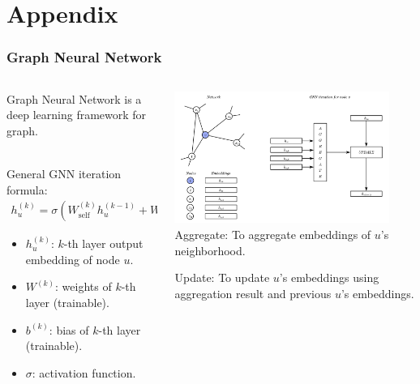\documentclass[notes, 10pt, aspectratio=169]{beamer}
\begin{document}
\section{Appendix}
\begin{frame}
    \frametitle{Graph Neural Network}
    \begin{columns}
        \begin{column}{0.5\textwidth}
            Graph Neural Network is a deep learning framework for graph.\par ~\\
            General GNN iteration formula:
            \begin{align*}
                \displaystyle
                h_u^{(k)} = \sigma (W_{\text{self}}^{(k)} h_u^{(k-1)} + W_n^{(k)}\sum_{v\in N(u)} h_v^{(k-1)} + b^{(k)} ) 
            \end{align*}
            \begin{itemize}
                \item[] $h_u^{(k)}$: $k$-th layer output embedding of node $u$.
                \item[] $W^{(k)}$: weights of $k$-th layer (trainable).
                \item[] $b^{(k)}$: bias of $k$-th layer (trainable).
                \item[] $\sigma$: activation function.
            \end{itemize}
        \end{column}
        \begin{column}{0.5\textwidth}
            \includegraphics[width=7cm]{./graphics/gnn.png}
            Aggregate: To aggregate embeddings of $u$’s neighborhood.\par \vspace{0.2cm}
            Update: To update $u$’s embeddings using aggregation result and previous $u$’s embeddings.
        \end{column}
    \end{columns}
\end{frame}
\end{document}
